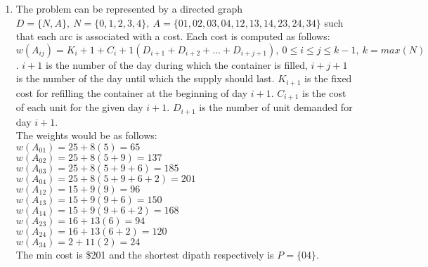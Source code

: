 \documentclass[a4paper,12pt]{article}
\begin{document}
\begin{enumerate}
\item
The problem can be represented by a directed graph $D=\{N,A\}, \ N=\{0,1,2,3,4\}, \ A=\{01,02,03,04,12,13,14,23,24,34\}$ such that each arc is associated with a cost. Each cost is computed as follows: $w(A_{ij}) = K_i+1 + C_i+1(D_{i+1} + D_{i+2} + ... + D_{i+j+1}), \ 0 \le i \le j \le k-1, \ k=max(N)$. $i+1$ is the number of the day during which the container is filled, $i+j+1$ is the number of the day until which the supply should last. $K_{i+1}$ is the fixed cost for refilling the container at the beginning of day $i+1$. $C_{i+1}$ is the cost of each unit for the given day ${i+1}$. $D_{i+1}$ is the number of unit demanded for day ${i+1}$.\\
The weights would be as follows:\\
$w(A_{01}) = 25 + 8(5) = 65$\\
$w(A_{02}) = 25 + 8(5+9) = 137$\\
$w(A_{03}) = 25 + 8(5+9+6) = 185$\\ 
$w(A_{04}) = 25 + 8(5+9+6+2) = 201$\\ 
$w(A_{12}) = 15 + 9(9) = 96$\\
$w(A_{13}) = 15 + 9(9+6) = 150$\\
$w(A_{14}) = 15 + 9(9+6+2) = 168$\\ 
$w(A_{23}) = 16 + 13(6) = 94$\\
$w(A_{24}) = 16 + 13(6+2) = 120$\\ 
$w(A_{34}) = 2 + 11(2) = 24$\\
The min cost is \$201 and the shortest dipath respectively is $P=\{04\}$.
\end{enumerate}
\end{document}
